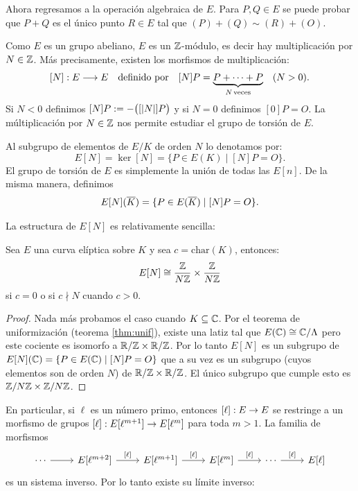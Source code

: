 \documentclass[../../tesis_maestria]{subfiles}
\begin{document}
Ahora regresamos a la operaci\'on algebraica de $E$. Para $P,Q\in E$ se puede probar que $P+Q$ es
el \'unico punto $R\in E$ tal que $(P)+(Q)\sim (R)+(O)$.

Como $E$ es un grupo abeliano, $E$ es un $\mathbb{Z}$-m\'odulo, es decir hay multiplicaci\'on por $N\in\mathbb{Z}$.
M\'as precisamente, existen los morfismos de multiplicaci\'on:
\[
  [N]:E\longrightarrow E \quad\text{definido por}\quad
  [N]P=\underset{N\,\text{veces}}{\underbrace{P+\cdots+P}}\quad(N>0).
\]
Si $N<0$ definimos $[N]P:=-\big([\left| N \right|]P\big)$ y si $N=0$ definimos $[0]P=O$. La m\'ultiplicaci\'on
por $N\in\mathbb{Z}$ nos permite estudiar el grupo de torsi\'on de $E$.

\begin{defin}
  Al subgrupo de elementos de $E/K$ de orden $N$ lo denotamos por:
  \[
    E[N]=\ker[N]=\{P\in E(K)\mid [N]P=O\}.
  \]
  El grupo de torsi\'on de $E$ es simplemente la uni\'on de todas las $E[n]$. De la misma
  manera, definimos
  \[
    E[N](\overline{K})=\{P\in E(\overline{K})\mid [N]P=O\}.
  \]
\end{defin}

La estructura de $E[N]$ es relativamente sencilla:

\begin{prop}\label{prop:estructura_EN}
  Sea $E$ una curva el\'iptica sobre $K$ y sea $c=\mathrm{char}(K)$, entonces:
  \[
    E[N]\cong \frac{\mathbb{Z}}{N\mathbb{Z}}\times\frac{\mathbb{Z}}{N\mathbb{Z}}
  \]
  si $c=0$ o si $c\nmid N$ cuando $c>0$.
\end{prop}

\begin{proof}
  Nada m\'as probamos el caso cuando $K\subseteq\mathbb{C}$. Por el teorema de uniformizaci\'on
  (teorema \ref{thm:unif}), existe una latiz tal que $E(\mathbb{C})\cong\mathbb{C}/\Lambda$ pero este cociente
  es isomorfo a $\mathbb{R}/\mathbb{Z}\times\mathbb{R}/\mathbb{Z}$. Por lo tanto $E[N]$ es un subgrupo
  de $E[N](\mathbb{C})=\{P\in E(\mathbb{C})\mid [N]P=O\}$ que a su vez es un subgrupo (cuyos elementos son de orden
  $N$) de $\mathbb{R}/\mathbb{Z}\times\mathbb{R}/\mathbb{Z}$. El \'unico subgrupo que cumple esto es $\mathbb{Z}/N\mathbb{Z}\times\mathbb{Z}/N\mathbb{Z}$.
\end{proof}

En particular, si $\ell$ es un n\'umero primo, entonces $[\ell]:E\rightarrow E$ se restringe a un morfismo
de grupos $[\ell]:E[\ell^{m+1}]\rightarrow E[\ell^m]$ para toda $m>1$. La familia de morfismos
\[
  \begin{tikzcd}
    \cdots \arrow[r] & E\text{[}\ell^{m+2}\text{]} \arrow[r,"\text{[}\ell\text{]}"] &
    E\text{[}\ell^{m+1}\text{]} \arrow[r,"\text{[}\ell\text{]}"] &
    E\text{[}\ell^{m}\text{]} \arrow[r,"\text{[}\ell\text{]}"] &
    \cdots \arrow[r,"\text{[}\ell\text{]}"] & E\text{[}\ell\text{]}
  \end{tikzcd}
\]
es un sistema inverso. Por lo tanto existe su l\'imite inverso:
\end{document}
